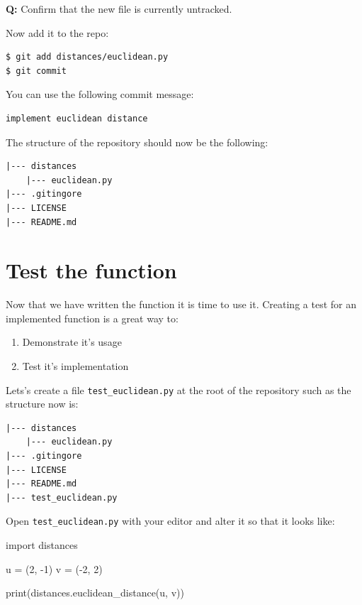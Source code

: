 \documentclass[11pt]{article}
\providecommand{\tightlist}{%
      \setlength{\itemsep}{0pt}\setlength{\parskip}{0pt}}
\newenvironment{Shaded}{}{}
\newcommand{\DecValTok}[1]{\textcolor[rgb]{0.25,0.63,0.44}{{#1}}}
\newcommand{\NormalTok}[1]{{#1}}
\newcommand{\ImportTok}[1]{{#1}}
\newcommand{\OperatorTok}[1]{\textcolor[rgb]{0.40,0.40,0.40}{{#1}}}
\newcommand{\BuiltInTok}[1]{{#1}}
\begin{document}
\textbf{Q:} Confirm that the new file is currently untracked.

Now add it to the repo:

\begin{verbatim}
$ git add distances/euclidean.py
$ git commit
\end{verbatim}

You can use the following commit message:

\begin{verbatim}
implement euclidean distance
\end{verbatim}

    The structure of the repository should now be the following:

\begin{verbatim}
|--- distances
    |--- euclidean.py
|--- .gitingore
|--- LICENSE   
|--- README.md
\end{verbatim}

    \hypertarget{test-the-function}{%
\section{Test the function}\label{test-the-function}}

    Now that we have written the function it is time to use it. Creating a
test for an implemented function is a great way to:

\begin{enumerate}
\def\labelenumi{\arabic{enumi}.}
\tightlist
\item
  Demonstrate it's usage
\item
  Test it's implementation
\end{enumerate}

Lets's create a file \texttt{test\_euclidean.py} at the root of the
repository such as the structure now is:

\begin{verbatim}
|--- distances
    |--- euclidean.py
|--- .gitingore
|--- LICENSE   
|--- README.md
|--- test_euclidean.py
\end{verbatim}

Open \texttt{test\_euclidean.py} with your editor and alter it so that
it looks like:

\begin{Shaded}
\begin{Highlighting}[]
\ImportTok{import}\NormalTok{ distances}

\NormalTok{u }\OperatorTok{=}\NormalTok{ (}\DecValTok{2}\NormalTok{, }\OperatorTok{{-}}\DecValTok{1}\NormalTok{)}
\NormalTok{v }\OperatorTok{=}\NormalTok{ (}\OperatorTok{{-}}\DecValTok{2}\NormalTok{, }\DecValTok{2}\NormalTok{)}

\BuiltInTok{print}\NormalTok{(distances.euclidean\_distance(u, v))}
\end{Highlighting}
\end{Shaded}
\end{document}

